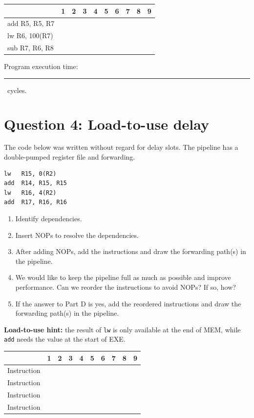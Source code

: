 \documentclass[11pt]{article}
\begin{document}
\bigskip
\begin{tabular}{@{}l|ccccccccc@{}}
\textbf{} & \textbf{1} & \textbf{2} & \textbf{3} & \textbf{4} & \textbf{5} & \textbf{6} & \textbf{7} & \textbf{8} & \textbf{9} \\
\midrule
add  R5, R5, R7 & & & & & & & & & \\
lw   R6, 100(R7) & & & & & & & & & \\
sub  R7, R6, R8 & & & & & & & & & \\
\bottomrule
\end{tabular}

\bigskip
Program execution time: \rule{2in}{0.4pt}\, cycles.

\newpage
\section*{Question 4: Load-to-use delay}
The code below was written without regard for delay slots. The pipeline has a double-pumped register file and forwarding.
\begin{verbatim}
lw   R15, 0(R2)
add  R14, R15, R15
lw   R16, 4(R2)
add  R17, R16, R16
\end{verbatim}
\begin{enumerate}[label=\Alph*.]
    \item Identify dependencies.
    \item Insert NOPs to resolve the dependencies.
    \item After adding NOPs, add the instructions and draw the forwarding path(s) in the pipeline.
    \item We would like to keep the pipeline full as much as possible and improve performance. Can we reorder the instructions to avoid NOPs? If so, how?
    \item If the answer to Part D is yes, add the reordered instructions and draw the forwarding path(s) in the pipeline.
\end{enumerate}

\bigskip
\textbf{Load-to-use hint:} the result of \texttt{lw} is only available at the end of MEM, while \texttt{add} needs the value at the start of EXE.

\bigskip
\begin{tabular}{@{}l|ccccccccc@{}}
\textbf{} & \textbf{1} & \textbf{2} & \textbf{3} & \textbf{4} & \textbf{5} & \textbf{6} & \textbf{7} & \textbf{8} & \textbf{9} \\
\midrule
Instruction & & & & & & & & & \\
Instruction & & & & & & & & & \\
Instruction & & & & & & & & & \\
Instruction & & & & & & & & & \\
\bottomrule
\end{tabular}
\end{document}
